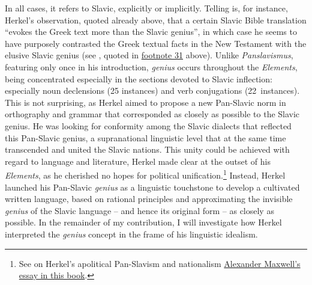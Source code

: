 In all cases, it refers to Slavic, explicitly or implicitly. Telling is, for instance, Herkel’s observation, quoted already above, that a certain Slavic Bible translation “evokes the Greek text more than the Slavic genius”, in which case he seems to have purposely contrasted the Greek textual facts in the New Testament with the elusive Slavic genius (see \cite[35]{herkel_elementa_1826}, quoted in \hyperlink{page.57}{footnote 31} above). Unlike \textit{Panslavismus}, featuring only once in his introduction, \textit{genius} occurs throughout the \textit{Elements}, being concentrated especially in the sections devoted to Slavic inflection: especially noun declensions (25 instances) and verb conjugations (22~instances). This is not surprising, as Herkel aimed to propose a new Pan-Slavic norm in orthography and grammar that corresponded as closely as possible to the Slavic genius. He was looking for conformity among the Slavic dialects that reflected this Pan-Slavic genius, a supranational linguistic level that at the same time transcended and united the Slavic nations. This unity could be achieved with regard to language and literature, Herkel made clear at the outset of his \textit{Elements}, as he cherished no hopes for political unification.\footnote{See on Herkel’s apolitical Pan-Slavism and nationalism \hyperref[ch:Maxwell]{Alexander Maxwell’s essay in this book}.} Instead, Herkel launched his Pan-Slavic \textit{genius} as a linguistic touchstone to develop a cultivated written language, based on rational principles and approximating the invisible \textit{genius} of the Slavic language – and hence its original form – as closely as possible. In the remainder of my contribution, I will investigate how Herkel interpreted the \textit{genius} concept in the frame of his linguistic idealism.


